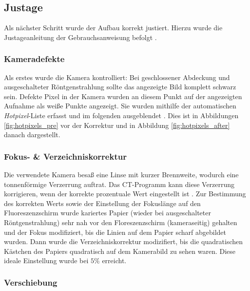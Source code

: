 \subsection{Justage}
Als nächster Schritt wurde der Aufbau korrekt justiert. Hierzu wurde die Justageanleitung der Gebrauchsanweisung befolgt \cite[3-4]{LDctmodul}.

\subsubsection*{Kameradefekte}

Als erstes wurde die Kamera kontrolliert: Bei geschlossener Abdeckung und ausgeschalteter Röntgenstrahlung sollte das angezeigte Bild komplett schwarz sein. Defekte Pixel in der Kamera wurden an diesem Punkt auf der angezeigten Aufnahme als weiße Punkte angezeigt. Sie wurden mithilfe der automatischen \textit{Hotpixel}-Liste erfasst und im folgenden ausgeblendet \cite[3]{LDctmodul}. Dies ist in Abbildungen \ref{fig:hotpixels_pre} vor der Korrektur und in Abbildung \ref{fig:hotpixels_after} danach dargestellt.


\subsubsection*{Fokus- \& Verzeichniskorrektur}

Die verwendete Kamera besaß eine Linse mit kurzer Brennweite, wodurch eine tonnenförmige Verzerrung auftrat. Das CT-Programm kann diese Verzerrung korrigieren, wenn der korrekte prozentuale Wert eingestellt ist \cite[3]{LDctmodul}. Zur Bestimmung des korrekten Werts sowie der Einstellung der Fokuslänge auf den Fluoreszenzschirm wurde kariertes Papier (wieder bei ausgeschalteter Röntgenstrahlung) sehr nah vor den Floreszenzschirm (kameraseitig) gehalten und der Fokus modifiziert, bis die Linien auf dem Papier scharf abgebildet wurden. Dann wurde die Verzeichniskorrektur modizifiert, bis die quadratischen Kästchen des Papiers quadratisch auf dem Kamerabild zu sehen waren. Diese ideale Einstellung wurde bei $5 \%$ erreicht.

\subsubsection*{Verschiebung}

